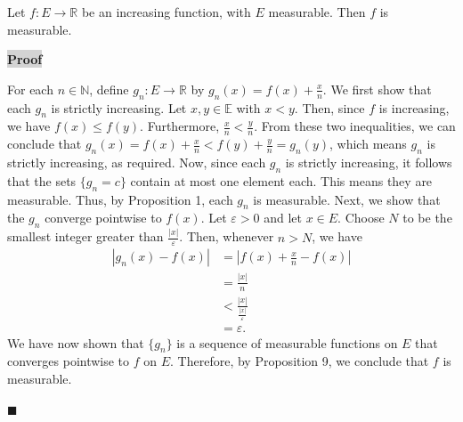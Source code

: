 \documentclass[12pt]{article}
\newcommand{\mybox}{%
    \collectbox{%
        \setlength{\fboxsep}{2pt}%
        \fbox{\BOXCONTENT}%
    }%
}
\begin{document}
\noindent Let $f:E\rightarrow\mathbb{R}$ be an increasing function, with $E$ measurable. Then $f$ is measurable. 

\vspace{5mm}

\noindent\mybox{\colorbox{lightgray}{\textbf{Proof}}}\hspace{3mm}\hrulefill

\noindent For each $n\in\mathbb{N}$, define $g_n: E \rightarrow \mathbb{R}$ by $g_n(x) = f(x) + \frac{x}{n}$. We first show that each $g_n$ is strictly increasing. Let $x,y\in\mathbb{E}$ with $x<y$. Then, since $f$ is increasing, we have $f(x)\leq f(y)$. Furthermore, $\frac{x}{n} < \frac{y}{n}$. From these two inequalities, we can conclude that $g_n(x) = f(x) + \frac{x}{n} < f(y) + \frac{y}{n} = g_n(y)$, which means $g_n$ is strictly increasing, as required. Now, since each $g_n$ is strictly increasing, it follows that the sets $\lbrace g_n = c \rbrace$ contain at most one element each. This means they are measurable. Thus, by Proposition 1, each $g_n$ is measurable. Next, we show that the $g_n$ converge pointwise to $f(x)$. Let $\varepsilon>0$ and let $x\in E$. Choose $N$ to be the smallest integer greater than $\frac{|x|}{\varepsilon}$. Then, whenever $n>N$, we have
\begin{align*}
    |g_n(x) - f(x)| &= \left|f(x)+\frac{x}{n}-f(x)\right| \\
    &= \frac{|x|}{n} \\
    &< \frac{|x|}{\frac{|x|}{\varepsilon}} \\
    &= \varepsilon.
\end{align*}
\noindent We have now shown that $\lbrace g_n \rbrace$ is a sequence of measurable functions on $E$ that converges pointwise to $f$ on $E$. Therefore, by Proposition 9, we conclude that $f$ is measurable.


\hfill$\blacksquare$
\end{document}
